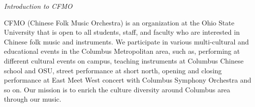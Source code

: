\documentclass[letter,6pt,poets]{ConcProg}
\begin{document}
\begin{spacing}{1.0}
\begin{multicols}{2}
\end{multicols}
\begin{center}
\Large\textsl{ Introduction to CFMO}
\end{center}

CFMO (Chinese Folk Music Orchestra) is an organization at the Ohio State University that is open to all students, staff, and faculty who are interested in Chinese folk music and instruments. We participate in various multi-cultural and educational events in the Columbus Metropolitan area, such as, performing at different cultural events on campus, teaching instruments at Columbus Chinese school and OSU, street performance at short north, opening and closing performance at East Meet West concert with Columbus Symphony Orchestra and so on. Our mission is to enrich the culture diversity around Columbus area through our music.
\end{spacing}
\end{document}
